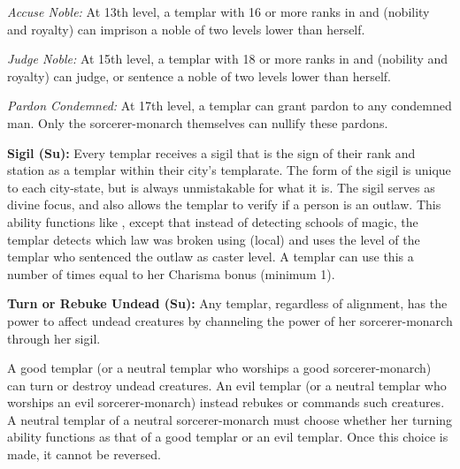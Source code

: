 \textit{Accuse Noble:} At 13th level, a templar with 16 or more ranks in  and  (nobility and royalty) can imprison a noble of two levels lower than herself.

\textit{Judge Noble:} At 15th level, a templar with 18 or more ranks in  and  (nobility and royalty) can judge, or sentence a noble of two levels lower than herself.

\textit{Pardon Condemned:} At 17th level, a templar can grant pardon to any condemned man. Only the sorcerer-monarch themselves can nullify these pardons.



\textbf{Sigil (Su):} Every templar receives a sigil that is the sign of their rank and station as a templar within their city's templarate. The form of the sigil is unique to each city-state, but is always unmistakable for what it is. The sigil serves as divine focus, and also allows the templar to verify if a person is an outlaw. This ability functions like , except that instead of detecting schools of magic, the templar detects which law was broken using  (local) and uses the level of the templar who sentenced the outlaw as caster level. A templar can use this a number of times equal to her Charisma bonus (minimum 1).


\textbf{Turn or Rebuke Undead (Su):} Any templar, regardless of alignment, has the power to affect undead creatures by channeling the power of her sorcerer-monarch through her sigil.

A good templar (or a neutral templar who worships a good sorcerer-monarch) can turn or destroy undead creatures. An evil templar (or a neutral templar who worships an evil sorcerer-monarch) instead rebukes or commands such creatures. A neutral templar of a neutral sorcerer-monarch must choose whether her turning ability functions as that of a good templar or an evil templar. Once this choice is made, it cannot be reversed.


